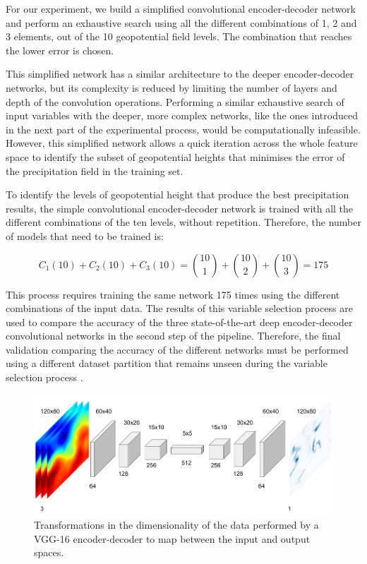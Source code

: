 \documentclass[twocol]{ametsoc}
\begin{document}
For our experiment, we build a simplified convolutional encoder-decoder network and perform an exhaustive search using all the different combinations of 1, 2 and 3 elements, out of the 10 geopotential field levels. The combination that reaches the lower error is chosen. 

This simplified network has a similar architecture to the deeper encoder-decoder networks, but its complexity is reduced by limiting the number of layers and depth of the convolution operations. Performing a similar exhaustive search of  input variables with the deeper, more complex networks, like the ones introduced in the next part of the experimental process, would be computationally infeasible. However, this simplified network allows a quick iteration across the whole feature space to identify the subset of geopotential heights that minimises the error of the precipitation field in the training set.

To identify the levels of geopotential height that produce the best precipitation results, the simple convolutional encoder-decoder network is trained with all the different combinations of the ten levels, without repetition. Therefore, the number of models that need to be trained is:

\begin{equation}
C_1(10) + C_2(10) + C_3(10) = \binom{10}{1} + \binom{10}{2} + \binom{10}{3} = 175
\end{equation}

This process requires training the same network 175 times using the different combinations of the input data. The results of this variable selection process are used to compare the accuracy of the three state-of-the-art deep encoder-decoder convolutional networks in the second step of the pipeline. Therefore, the final validation comparing the accuracy of the different networks must be performed using a different dataset partition that remains unseen during the variable selection process  \citep{reunanen2003overfitting}.

\begin{figure}[h]
 \centerline{\includegraphics[width=13cm]{vgg16_enc.png}}
  \caption{Transformations in the dimensionality of the data performed by a VGG-16 encoder-decoder to map between the input and output spaces.}\label{vgg16}
\end{figure}
\end{document}

